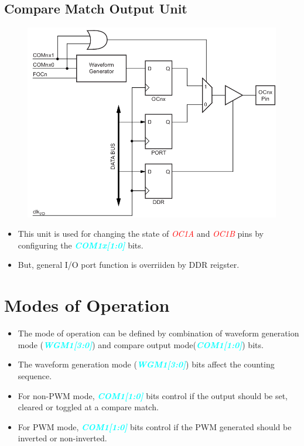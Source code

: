 \documentclass{article}
\newcommand{\bitFormat}[1]{\emph{\textbf{\textcolor{cyan}{#1}}}}
\newcommand{\pinFormat}[1]{\emph{\textcolor{red}{#1}}}
\begin{document}
\subsection{Compare Match Output Unit}
\begin{figure}[H]
    \begin{center}
        \includegraphics[height=0.3\textheight]{Timer1ComparteMatchOutput.png}
    \end{center}
\end{figure}
\begin{itemize}
    \item This unit is used for changing the state of \pinFormat{OC1A} and \pinFormat{OC1B} pins by configuring the \bitFormat{COM1x[1:0]} bits.
    \item But, general I/O port function is overriiden by DDR reigster.
\end{itemize}


\section{Modes of Operation}
\begin{itemize}
    \item The mode of operation can be defined by combination of waveform generation mode (\bitFormat{WGM1[3:0]}) and compare output mode(\bitFormat{COM1[1:0]}) bits.
    \item The waveform generation mode (\bitFormat{WGM1[3:0]}) bits affect the counting sequence.
    \item For non-PWM mode, \bitFormat{COM1[1:0]} bits control if the output should be set, cleared or toggled at a compare match.
    \item For PWM mode, \bitFormat{COM1[1:0]} bits control if the PWM generated should be inverted or non-inverted.
\end{itemize}
\end{document}
